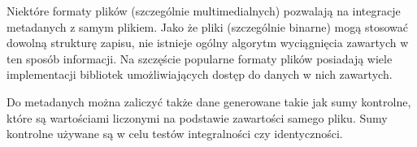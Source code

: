 \par
Niektóre formaty plików (szczególnie multimedialnych) pozwalają na integracje metadanych z samym plikiem. Jako że pliki (szczególnie binarne) mogą stosować dowolną strukturę zapisu, nie istnieje ogólny algorytm wyciągnięcia zawartych w ten sposób informacji. Na szczęście popularne formaty plików posiadają wiele implementacji bibliotek umożliwiających dostęp do danych w nich zawartych.

\par
Do metadanych można zaliczyć także dane generowane takie jak sumy kontrolne, które są wartościami liczonymi na podstawie zawartości samego pliku. Sumy kontrolne używane są w celu testów integralności czy identyczności.

